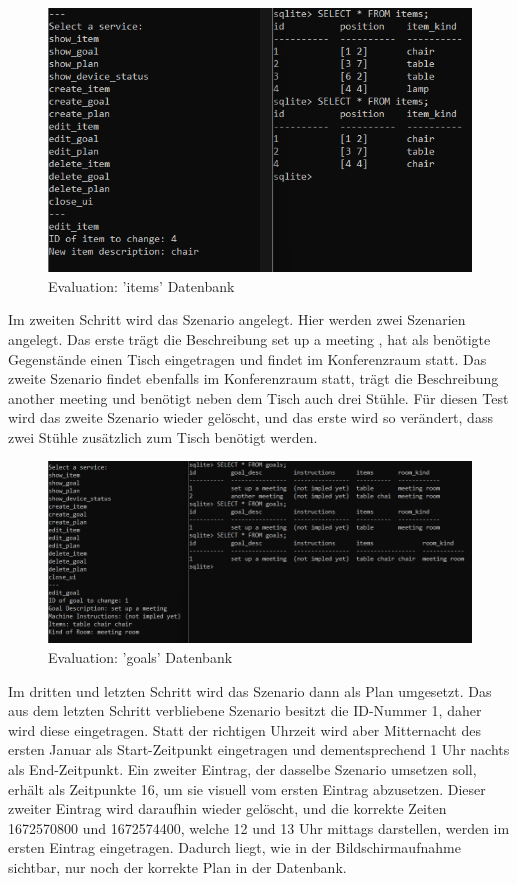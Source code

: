 \begin{figure}[h]
\centering
\includegraphics[width=(0.7\textwidth)]{Bilder/Eval1.png}
\caption{Evaluation: 'items' Datenbank}
\end{figure}

Im zweiten Schritt wird das Szenario angelegt. Hier werden zwei Szenarien angelegt. Das erste trägt die Beschreibung \dq set up a meeting \dq, hat als benötigte Gegenstände einen Tisch eingetragen und findet im Konferenzraum statt. Das zweite Szenario findet ebenfalls im Konferenzraum statt, trägt die Beschreibung \dq another meeting \dq und benötigt neben dem Tisch auch drei Stühle. Für diesen Test wird das zweite Szenario wieder gelöscht, und das erste wird so verändert, dass zwei Stühle zusätzlich zum Tisch benötigt werden.

\begin{figure}[h]
\centering
\includegraphics[width=(\textwidth)]{Bilder/Eval2.png}
\caption{Evaluation: 'goals' Datenbank}
\end{figure}

Im dritten und letzten Schritt wird das Szenario dann als Plan umgesetzt. Das aus dem letzten Schritt verbliebene Szenario besitzt die ID-Nummer 1, daher wird diese eingetragen. Statt der richtigen Uhrzeit wird aber Mitternacht des ersten Januar als Start-Zeitpunkt eingetragen und dementsprechend 1 Uhr nachts als End-Zeitpunkt. Ein zweiter Eintrag, der dasselbe Szenario umsetzen soll, erhält als Zeitpunkte 16, um sie visuell vom ersten Eintrag abzusetzen. Dieser zweiter Eintrag wird daraufhin wieder gelöscht, und die korrekte Zeiten 1672570800 und 1672574400, welche 12 und 13 Uhr mittags darstellen, werden im ersten Eintrag eingetragen. Dadurch liegt, wie in der Bildschirmaufnahme sichtbar, nur noch der korrekte Plan in der Datenbank.

